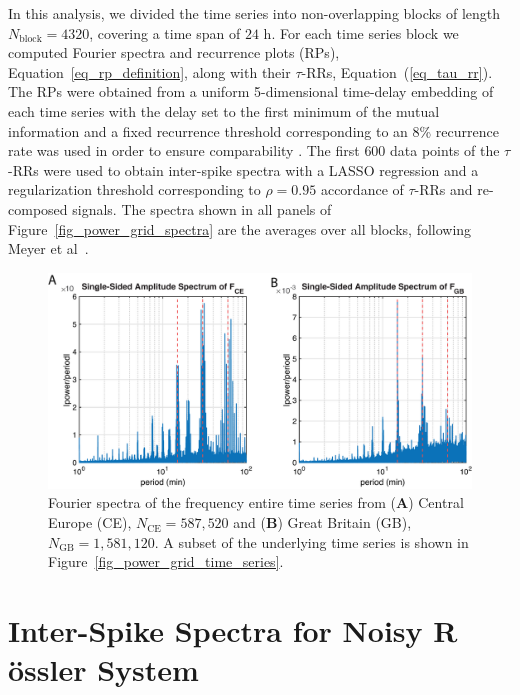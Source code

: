 \documentclass[entropy,article,accept,pdftex,moreauthors]{Definitions/mdpi}
\begin{document}
In this analysis, we divided the time series into 
non-overlapping blocks of length $N_{\text{block}}=4320$, covering a time span of $24$ h. For each time series block we computed Fourier spectra and recurrence plots (RPs), 
Equation~\eqref{eq_rp_definition}, along with their $\tau$-RRs, Equation~(\ref{eq_tau_rr}). The RPs were obtained from a uniform 5-dimensional time-delay embedding of each time series with 
the delay set to the first minimum of the mutual information \cite{fraser1986,hegger1999} and a fixed recurrence threshold corresponding to an 8\% recurrence rate was used in order 
to ensure comparability \cite{kraemer2018}. The first $600$ data points of the $\tau$-RRs were used to obtain inter-spike spectra with a LASSO regression and a 
regularization threshold corresponding to $\rho=0.95$ accordance of $\tau$-RRs and re-composed signals. The spectra shown in all panels of Figure~\ref{fig_power_grid_spectra} 
are the averages over all blocks, following Meyer et al~\cite{meyer2020identifying}.

\begin{figure}[H]
 \includegraphics[width=\textwidth]{./figures/fig_power_grid_fft_full}
 \caption{Fourier spectra of the frequency entire time series from (\textbf{A}) Central Europe (CE), \mbox{$N_{\text{CE}}=587,520$} and (\textbf{B}) Great Britain (GB), $N_{\text{GB}}=1,581,120$. A subset of the underlying time series is shown in Figure~\ref{fig_power_grid_time_series}.}
\label{fig_power_grid_fft_full}
\end{figure}



\section{Inter-Spike Spectra for Noisy R \"ossler System}\label{appc}
\end{document}
